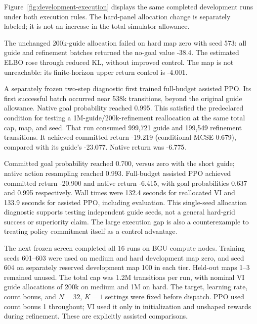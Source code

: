 

Figure~\ref{fig:development-execution} displays the same completed development
runs under both execution rules. The hard-panel allocation change is separately
labeled; it is not an increase in the total simulator allowance.

The unchanged 200k-guide allocation failed on hard map zero with seed 573:
all guide and refinement batches returned the no-goal value -38.4. The estimated
ELBO rose through reduced KL, without improved control. The map is not
unreachable: its finite-horizon upper return control is -4.001.

A separately frozen two-step diagnostic first trained full-budget assisted PPO.
Its first successful batch occurred near 538k transitions, beyond the original
guide allowance. Native goal probability reached 0.995. This satisfied the
predeclared condition for testing a 1M-guide/200k-refinement reallocation at the
same total cap, map, and seed. That run consumed 999,721 guide and 199,549
refinement transitions. It achieved committed return -19.219 (conditional MCSE
0.679), compared with its guide's -23.077. Native return was -6.775.

Committed goal probability reached 0.700, versus zero with the short guide;
native action resampling reached 0.993. Full-budget assisted PPO achieved
committed return -20.900 and native return -6.415, with goal probabilities
0.637 and 0.995 respectively. Wall times were 132.4 seconds for reallocated
VI and 133.9 seconds for assisted PPO, including evaluation. This single-seed
allocation diagnostic supports testing independent guide seeds, not a general
hard-grid success or superiority claim. The large execution gap is also a
counterexample to treating policy commitment itself as a control advantage.




The next frozen screen completed all 16 runs on BGU compute nodes. Training
seeds 601--603 were used on medium and hard development map zero, and seed
604 on separately reserved development map 100 in each tier. Held-out maps
1--3 remained unused. The total cap was 1.2M transitions per run, with nominal
VI guide allocations of 200k on medium and 1M on hard. The target, learning
rate, count bonus, and $N=32$, $K=1$ settings were fixed before dispatch.
PPO used count bonus 1 throughout; VI used it only in initialization and
unshaped rewards during refinement. These are explicitly assisted comparisons.

